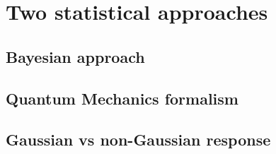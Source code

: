 \section{Two statistical approaches}
\subsection{Bayesian approach}

\subsection{Quantum Mechanics formalism}

\subsection{Gaussian vs non-Gaussian response}

